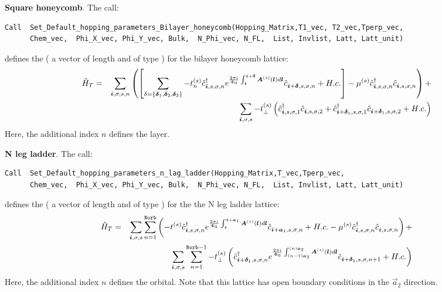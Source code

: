\noindent
\textbf{Square honeycomb}.     The call:
 \begin{lstlisting}[style=fortran]
Call  Set_Default_hopping_parameters_Bilayer_honeycomb(Hopping_Matrix,T1_vec, T2_vec,Tperp_vec, 
      Chem_vec,  Phi_X_vec, Phi_Y_vec, Bulk,  N_Phi_vec, N_FL,  List, Invlist, Latt, Latt_unit)
\end{lstlisting}  
defines  the   (  a vector of length   and of type  )    for the  bilayer   honeycomb  lattice:                 
\begin{eqnarray}
\hat{H}_T  =  & &   \sum_{\boldsymbol{i}, \sigma, s,n } \left(    \left[  \sum_{ \delta = \left\{ \boldsymbol{\delta}_1, \boldsymbol{\delta}_2, \boldsymbol{\delta}_3 \right\} }  - t_n^{(s)} \hat{c}^{\dagger}_{\boldsymbol{i},s,\sigma,n}   e^{\frac{2 \pi i}{\Phi_0} \int_{\boldsymbol{i}}^{\boldsymbol{i}+ \boldsymbol{\delta}}  \boldsymbol{A}^{(s)}(\boldsymbol{l})  d \boldsymbol{l}}   \hat{c}^{}_{\boldsymbol{i} + \boldsymbol{\delta},s,\sigma,n} +  H.c. \right]       -  \mu^{(s)} \hat{c}^{\dagger}_{\boldsymbol{i},s,\sigma,n} \hat{c}^{}_{\boldsymbol{i},s,\sigma,n}  \right)  +  \nonumber \\
      & &    \sum_{\boldsymbol{i}, \sigma, s } -  t_{\perp}^{(s)}  \left( \hat{c}^{\dagger}_{\boldsymbol{i},s,\sigma,1} \hat{c}^{}_{\boldsymbol{i},s,\sigma,2}   +
                   \hat{c}^{\dagger}_{\boldsymbol{i} + \boldsymbol{\delta}_1,s,\sigma,1} \hat{c}^{}_{\boldsymbol{i} + \boldsymbol{\delta}_1,s,\sigma,2}  + H.c.  \right) 
\end{eqnarray}
Here, the additional  index  $n$  defines the   layer.  


\noindent
\textbf{N leg ladder}.     The call:
 \begin{lstlisting}[style=fortran]
Call  Set_Default_hopping_parameters_n_lag_ladder(Hopping_Matrix,T_vec,Tperp_vec, 
      Chem_vec,  Phi_X_vec, Phi_Y_vec, Bulk,  N_Phi_vec, N_FL,  List, Invlist, Latt, Latt_unit)
\end{lstlisting}  
defines  the   (  a vector of length   and of type  )    for the   the  N leg ladder lattice:                 
\begin{eqnarray}
\hat{H}_T  =  & &   \sum_{\boldsymbol{i}, \sigma, s }  \sum_{n=1}^{\texttt{Norb}} \left(      - t^{(s)} \hat{c}^{\dagger}_{\boldsymbol{i},s,\sigma,n}   e^{\frac{2 \pi i}{\Phi_0} \int_{\boldsymbol{i}}^{\boldsymbol{i}+ \boldsymbol{a}_1}  \boldsymbol{A}^{(s)}(\boldsymbol{l})  d \boldsymbol{l}}   \hat{c}^{}_{\boldsymbol{i} + \boldsymbol{a}_1,s,\sigma,n} +  H.c.       -  \mu^{(s)} \hat{c}^{\dagger}_{\boldsymbol{i},s,\sigma,n} \hat{c}^{}_{\boldsymbol{i},s,\sigma,n}  \right)  +  \nonumber \\
      & &    \sum_{\boldsymbol{i}, \sigma, s } \sum_{n=1}^{\texttt{Norb}-1}  -  t_{\perp}^{(s)}  \left( 
                   \hat{c}^{\dagger}_{\boldsymbol{i} + \boldsymbol{\delta}_1,s,\sigma,n}  e^{\frac{2 \pi i}{\Phi_0} \int_{(n-1)\boldsymbol{a}_2}^{(n)\boldsymbol{a}_2}  \boldsymbol{A}^{(s)}(\boldsymbol{l})  d \boldsymbol{l}}    \hat{c}^{}_{\boldsymbol{i} + \boldsymbol{\delta}_1,s,\sigma,n+1}  + H.c.  \right) 
\end{eqnarray}
Here, the additional  index  $n$  defines  the orbital.  Note that this lattice  has open boundary conditions in the $\vec{a}_2$  direction. 
